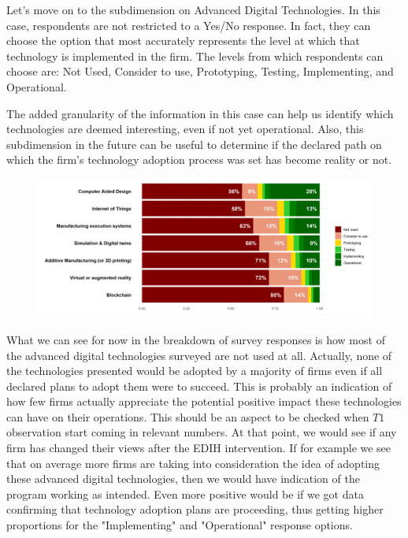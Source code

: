 \documentclass[12pt]{report}
\begin{document}
\par Let's move on to the subdimension on Advanced Digital Technologies. In this case, respondents are not restricted to a Yes/No response. In fact, they can choose the option that most accurately represents the level at which that technology is implemented in the firm. The levels from which respondents can choose are: Not Used, Consider to use, Prototyping, Testing, Implementing, and Operational.

\par The added granularity of the information in this case can help us identify which technologies are deemed interesting, even if not yet operational. Also, this subdimension in the future can be useful to determine if the declared path on which the firm's technology adoption process was set has become reality or not.

\begin{figure}[h!]
    \centering
    \includegraphics[width=\linewidth]{../Output/q4.png}
    \caption{}
    \label{fig:q4_table}
\end{figure}

\par What we can see for now in the breakdown of survey responses is how most of the advanced digital technologies surveyed are not used at all. Actually, none of the technologies presented would be adopted by a majority of firms even if all declared plans to adopt them were to succeed. This is probably an indication of how few firms actually appreciate the potential positive impact these technologies can have on their operations. This should be an aspect to be checked when $T1$ observation start coming in relevant numbers. At that point, we would see if any firm has changed their views after the EDIH intervention. If for example we see that on average more firms are taking into consideration the idea of adopting these advanced digital technologies, then we would have indication of the program working as intended. Even more positive would be if we got data confirming that technology adoption plans are proceeding, thus getting higher proportions for the "Implementing" and "Operational" response options.
\end{document}
